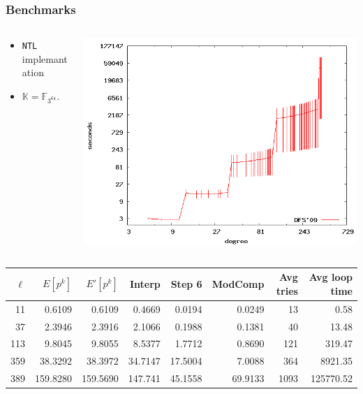 \documentclass[10pt]{beamer}
\newcommand{\K}{\mathbb{K}}  %
\newcommand{\F}{\mathbb{F}}  %
\newcommand{\0}{\mathcal{O}}  %
\begin{document}

\begin{frame}
  \frametitle{Benchmarks}

  
  \begin{columns}
    \begin{column}{0.4\textwidth}
      \begin{itemize}
      \item \texttt{NTL} implemantation
      \item $\K = \F_{3^{64}}$.
      \end{itemize}
    \end{column}
    \begin{column}{0.6\textwidth}
      \includegraphics[width=\textwidth]{3-64}

    \end{column}
  \end{columns}
  
  \smallskip
  \footnotesize
  \centering
  \begin{tabular}{r r r r r r r r}
    \hline
    $\ell$ & $E[p^k]$ & $E'[p^k]$ & Interp & Step 6 & ModComp & Avg tries & Avg loop time\\
    \hline
    11 & 0.6109 & 0.6109 & 0.4669 & 0.0194 & 0.0249 & 13 & 0.58 \\
    37 & 2.3946 & 2.3916 & 2.1066 & 0.1988 & 0.1381 & 40 & 13.48 \\
    113 & 9.8045 & 9.8055 & 8.5377 & 1.7712 & 0.8690 & 121 & 319.47 \\
    359 & 38.3292 & 38.3972 & 34.7147 & 17.5004 & 7.0088 & 364 & 8921.35 \\ 
    389 & 159.8280 & 159.5690 & 147.741 & 45.1558 & 69.9133 & 1093 & 125770.52  \\   
    \hline
  \end{tabular}
\end{frame}
\end{document}
